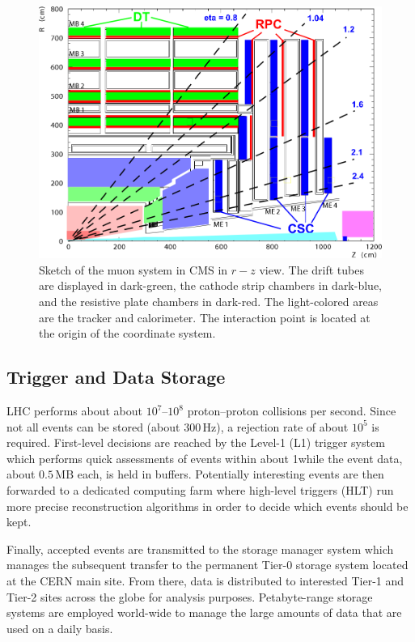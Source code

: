 \begin{figure}
	\includegraphics[width=\textwidth]{Detector/muon}
	\centering
	\caption{Sketch of the muon system in CMS in $r - z$ view. The drift tubes are displayed in dark-green, the cathode strip chambers in dark-blue, and the resistive plate chambers in dark-red. The light-colored areas are the tracker and calorimeter. The interaction point is located at the origin of the coordinate system.}
	\label{fig:muonSystem}
\end{figure}

\subsection{Trigger and Data Storage}
LHC performs about about $10^7$--$10^8$ proton--proton collisions per second. Since not all events can be stored (about $300\,\text{Hz}$), a rejection rate of about $10^5$ is required. First-level decisions are reached by the Level-1 (L1) trigger system which performs quick assessments of events within about 1\mus while the event data, about $0.5\,\text{MB}$ each, is held in buffers. Potentially interesting events are then forwarded to a dedicated computing farm where high-level triggers (HLT) run more precise reconstruction algorithms in order to decide which events should be kept.

Finally, accepted events are transmitted to the storage manager system which manages the subsequent transfer to the permanent Tier-0 storage system located at the CERN main site. From there, data is distributed to interested Tier-1 and Tier-2 sites across the globe for analysis purposes. Petabyte-range storage systems are employed world-wide to manage the large amounts of data that are used on a daily basis.
